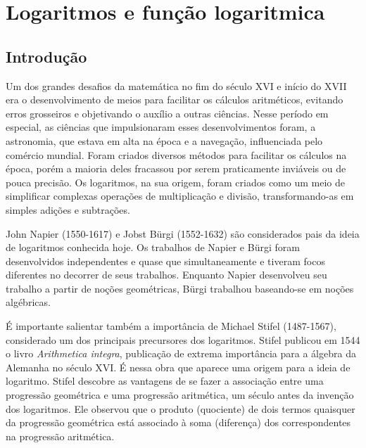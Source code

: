 \chapter{Logaritmos e função logaritmica}
\section{Introdução}

Um dos grandes desafios da matemática no fim do século XVI e início do XVII era o desenvolvimento de meios para facilitar os cálculos aritméticos, evitando erros grosseiros e objetivando o auxílio a outras ciências. Nesse período em especial, as ciências que impulsionaram esses desenvolvimentos foram, a astronomia, que estava em alta na época e a navegação, influenciada pelo comércio mundial. Foram criados diversos métodos para facilitar os cálculos na época, porém a maioria deles fracassou por serem praticamente inviáveis ou de pouca precisão. Os logaritmos, na sua origem, foram criados como um meio de simplificar complexas operações de multiplicação e divisão, transformando-as em simples adições e subtrações.

John Napier (1550-1617) e Jobst Bürgi (1552-1632) são considerados pais da ideia de logaritmos conhecida hoje. Os trabalhos de Napier e Bürgi foram desenvolvidos independentes e quase que simultaneamente e tiveram focos diferentes no decorrer de seus trabalhos. Enquanto Napier desenvolveu seu trabalho a partir de noções geométricas, Bürgi trabalhou baseando-se em noções algébricas. 

É importante salientar também a importância de Michael Stifel (1487-1567), considerado um dos principais precursores dos logaritmos. Stifel publicou em 1544 o livro \textit{Arithmetica integra}, publicação de extrema importância para a álgebra da Alemanha no século XVI. É nessa obra que aparece uma origem para a ideia de logaritmo. Stifel descobre as vantagens de se fazer a associação entre uma progressão geométrica e uma progressão aritmética, um século antes da invenção dos logaritmos. Ele observou que o produto (quociente) de dois termos quaisquer da progressão geométrica está associado à soma (diferença) dos correspondentes na progressão aritmética.

